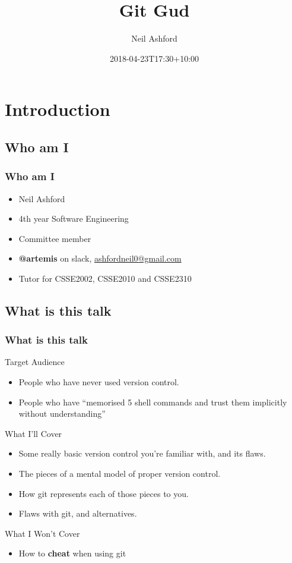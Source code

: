 \documentclass{beamer}
\title{Git Gud}
\author{Neil Ashford}
\institute{UQ Computing Society}
\date{2018-04-23T17:30+10:00}
\begin{document}
\begin{frame}
    \titlepage
\end{frame}

\section{Introduction}

\subsection{Who am I}
\begin{frame}
    \frametitle{Who am I}
    \begin{itemize}[<+->]
        \item Neil Ashford
        \item 4th year Software Engineering
        \item Committee member
        \item \textbf{@artemis} on slack, \url{ashfordneil0@gmail.com}
        \item Tutor for CSSE2002, CSSE2010 and CSSE2310
    \end{itemize}
\end{frame}

\subsection{What is this talk}
\begin{frame}
    \frametitle{What is this talk}
    Target Audience
    \pause
    \begin{itemize}[<+->]
        \item People who have never used version control.
        \item People who have ``memorised 5 shell commands and trust them implicitly without understanding''
    \end{itemize}
    \pause
    What I'll Cover
    \begin{itemize}[<+->]
        \item Some really basic version control you're familiar with, and its flaws.
        \item The pieces of a mental model of proper version control.
        \item How git represents each of those pieces to you.
        \item Flaws with git, and alternatives.
    \end{itemize}
    \pause
    What I Won't Cover
    \begin{itemize}[<+->]
        \item How to \textbf{cheat} when using git
    \end{itemize}
\end{frame}
\end{document}

